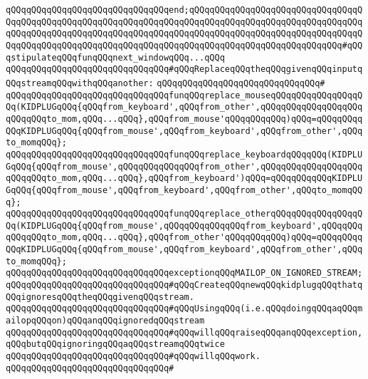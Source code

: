 \newline
\verb|qQQqqQQqqQQqqQQqqQQqqQQqqQQqqQQqend;qQQqqQQqqQQqqQQqqQQqqQQqqQQqqQQqqQQqqQQqqQQqqQQqqQQqqQQqqQQqqQQqqQQqqQQqqQQqqQQqqQQqqQQqqQQqqQQqqQQqqQQqqQQqqQQqqQQqqQQqqQQqqQQqqQQqqQQqqQQqqQQqqQQqqQQqqQQqqQQqqQQqqQQqqQQqqQQqqQQqqQQqqQQqqQQqqQQqqQQqqQQqqQQqqQQqqQQqqQQqqQQqqQQqqQQqqQQqqQQq#qQQqstipulateqQQqfunqQQqnext_windowqQQq...qQQq|\newline
\newline
\verb|qQQqqQQqqQQqqQQqqQQqqQQqqQQqqQQq#qQQqReplaceqQQqtheqQQqgivenqQQqinputqQQqstreamqQQqwithqQQqanother:|\newline
\verb|qQQqqQQqqQQqqQQqqQQqqQQqqQQqqQQq#|\newline
\verb|qQQqqQQqqQQqqQQqqQQqqQQqqQQqqQQqfunqQQqreplace_mouseqQQqqQQqqQQqqQQqqQQq(KIDPLUGqQQq{qQQqfrom_keyboard',qQQqfrom_other',qQQqqQQqqQQqqQQqqQQqqQQqqQQqto_mom,qQQq...qQQq},qQQqfrom_mouse'qQQqqQQqqQQq)qQQq=qQQqqQQqqQQqKIDPLUGqQQq{qQQqfrom_mouse',qQQqfrom_keyboard',qQQqfrom_other',qQQqto_momqQQq};|\newline
\verb|qQQqqQQqqQQqqQQqqQQqqQQqqQQqqQQqfunqQQqreplace_keyboardqQQqqQQq(KIDPLUGqQQq{qQQqfrom_mouse',qQQqqQQqqQQqqQQqfrom_other',qQQqqQQqqQQqqQQqqQQqqQQqqQQqto_mom,qQQq...qQQq},qQQqfrom_keyboard')qQQq=qQQqqQQqqQQqKIDPLUGqQQq{qQQqfrom_mouse',qQQqfrom_keyboard',qQQqfrom_other',qQQqto_momqQQq};|\newline
\verb|qQQqqQQqqQQqqQQqqQQqqQQqqQQqqQQqfunqQQqreplace_otherqQQqqQQqqQQqqQQqqQQq(KIDPLUGqQQq{qQQqfrom_mouse',qQQqqQQqqQQqqQQqfrom_keyboard',qQQqqQQqqQQqqQQqto_mom,qQQq...qQQq},qQQqfrom_other'qQQqqQQqqQQq)qQQq=qQQqqQQqqQQqKIDPLUGqQQq{qQQqfrom_mouse',qQQqfrom_keyboard',qQQqfrom_other',qQQqto_momqQQq};|\newline
\newline
\verb|qQQqqQQqqQQqqQQqqQQqqQQqqQQqqQQqexceptionqQQqMAILOP_ON_IGNORED_STREAM;|\newline
\newline
\verb|qQQqqQQqqQQqqQQqqQQqqQQqqQQqqQQq#qQQqCreateqQQqnewqQQqkidplugqQQqthatqQQqignoresqQQqtheqQQqgivenqQQqstream.|\newline
\verb|qQQqqQQqqQQqqQQqqQQqqQQqqQQqqQQq#qQQqUsingqQQq(i.e.qQQqdoingqQQqaqQQqmailopqQQqon)qQQqanqQQqignoredqQQqstream|\newline
\verb|qQQqqQQqqQQqqQQqqQQqqQQqqQQqqQQq#qQQqwillqQQqraiseqQQqanqQQqexception,qQQqbutqQQqignoringqQQqaqQQqstreamqQQqtwice|\newline
\verb|qQQqqQQqqQQqqQQqqQQqqQQqqQQqqQQq#qQQqwillqQQqwork.|\newline
\verb|qQQqqQQqqQQqqQQqqQQqqQQqqQQqqQQq#|\newline
